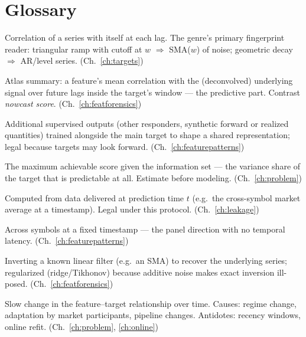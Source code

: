 \chapter{Glossary}
\label{app:glossary}

\begin{description}[style=nextline, itemsep=2pt]

\item[ACF (autocorrelation function)] Correlation of a series with itself
at each lag. The genre's primary fingerprint reader: triangular ramp with
cutoff at $w$ $\Rightarrow$ SMA($w$) of noise; geometric decay
$\Rightarrow$ AR/level series. (Ch.~\ref{ch:targets})

\item[Alpha score] Atlas summary: a feature's mean correlation with the
(deconvolved) underlying signal over future lags inside the target's
window --- the predictive part. Contrast \emph{nowcast score}.
(Ch.~\ref{ch:featforensics})

\item[Auxiliary targets / aux heads] Additional supervised outputs
(other responders, synthetic forward or realized quantities) trained
alongside the main target to shape a shared representation; legal
because targets may look forward. (Ch.~\ref{ch:featurepatterns})

\item[Ceiling (noise ceiling)] The maximum achievable score given the
information set --- the variance share of the target that is predictable
at all. Estimate before modeling. (Ch.~\ref{ch:problem})

\item[Contemporaneous feature] Computed from data delivered at prediction
time $t$ (e.g.\ the cross-symbol market average at a timestamp). Legal
under this protocol. (Ch.~\ref{ch:leakage})

\item[Cross-sectional] Across symbols at a fixed timestamp --- the panel
direction with no temporal latency. (Ch.~\ref{ch:featurepatterns})

\item[Deconvolution] Inverting a known linear filter (e.g.\ an SMA) to
recover the underlying series; regularized (ridge/Tikhonov) because
additive noise makes exact inversion ill-posed.
(Ch.~\ref{ch:featforensics})

\item[Drift] Slow change in the feature--target relationship over time.
Causes: regime change, adaptation by market participants, pipeline
changes. Antidotes: recency windows, online refit.
(Ch.~\ref{ch:problem}, \ref{ch:online})


\end{description}
